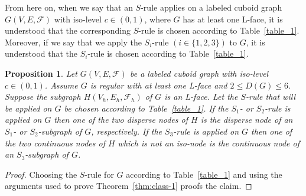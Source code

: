 \documentclass[a4paper,11pt]{article}
\newtheorem{proposition}[theorem]{Proposition}
\begin{document}
From here on, when we say that an $S$-rule applies on a labeled cuboid graph
$G(V,E,\mathcal{F})$ with iso-level $c\in (0,1)$, where $G$ has at least one L-face, it is understood
that the corresponding $S$-rule is chosen according to Table~\ref{table_1}. Moreover, if we say that
we apply the $S_i$-rule $(i\in\{1,2,3\})$ to $G$, it is understood that the $S_i$-rule is chosen
according to Table~\ref{table_1}.

\begin{proposition}
Let $G(V,E,\mathcal{F})$ be a labeled cuboid graph with iso-level $c\in (0,1)$. Assume $G$ is regular with
at least one L-face and $2\leq D(G)\leq 6$. Suppose the subgraph $H(V_h,E_h,\mathcal{F}_h)$ of $G$
is an L-face. Let the $S$-rule that will be applied on $G$ be chosen according to Table~\ref{table_1}. If
the $S_1$- or $S_2$-rule is applied on $G$ then one of the two disperse nodes of $H$ is the disperse node
of an $S_1$- or $S_2$-subgraph of $G$, respectively. If the $S_3$-rule is applied on $G$ then one of the
two continuous nodes of $H$ which is not an iso-node is the continuous node of an $S_3$-subgraph of $G$.
\label{prop:class-3}
\end{proposition}
\begin{proof}
Choosing the $S$-rule for $G$ according to Table~\ref{table_1} and using the arguments used to prove
Theorem~\ref{thm:class-1} proofs the claim.
\end{proof}
\end{document}
